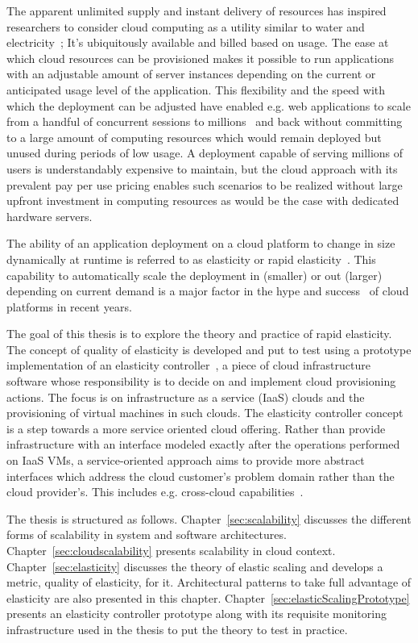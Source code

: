 \documentclass[english]{tktltiki2}
\theoremstyle{definition}
\theoremstyle{remark}
\begin{document}
The apparent unlimited supply and instant delivery of resources has inspired
researchers to consider cloud computing as a utility similar to water and
electricity~\cite{Buyya2009a}; It’s ubiquitously available and billed based on
usage. The ease at which cloud resources can be provisioned makes it possible to
run applications with an adjustable amount of server instances depending on the
current or anticipated usage level of the application. This flexibility and the
speed with which the deployment can be adjusted have enabled e.g. web
applications to scale from a handful of concurrent sessions to millions~\cite{
cloudberkeleyviewacm} and back without committing to a large amount of computing
resources which would remain deployed but unused during periods of low usage. A
deployment capable of serving millions of users is understandably expensive to
maintain, but the cloud approach with its prevalent pay per use pricing enables
such scenarios to be realized without large upfront investment in computing
resources as would be the case with dedicated hardware servers.

The ability of an application deployment on a cloud platform to change in size
dynamically at runtime is referred to as elasticity or rapid elasticity~\cite{
nistdefinition}. This capability to automatically scale the deployment in
(smaller) or out (larger) depending on current demand is a major factor in
the hype and success~\cite{cloudberkeleyviewacm} of cloud platforms in recent years.

The goal of this thesis is to explore the theory and practice of rapid
elasticity. The concept of quality of elasticity is developed and put to test
using a prototype implementation of an elasticity controller~\cite{VRB11}, a
piece of cloud infrastructure software whose responsibility is to decide on and
implement cloud provisioning actions. The focus is on infrastructure as a
service (IaaS) clouds and the provisioning of virtual machines in such clouds.
The elasticity controller concept is a step towards a more service oriented
cloud offering. Rather than provide infrastructure with an interface modeled
exactly after the operations performed on IaaS VMs, a service-oriented approach
aims to provide more abstract interfaces which address the cloud customer’s
problem domain rather than the cloud provider’s. This includes e.g. cross-cloud
capabilities~\cite{frominfratoservice}.

The thesis is structured as follows. Chapter~\ref{sec:scalability} discusses the
different forms of scalability in system and software architectures.
Chapter~\ref{sec:cloudscalability} presents scalability in cloud context.
Chapter~\ref{sec:elasticity} discusses the theory of elastic scaling and
develops a metric, quality of elasticity, for it. Architectural patterns to take
full advantage of elasticity are also presented in this chapter.
Chapter~\ref{sec:elasticScalingPrototype} presents an elasticity controller
prototype along with its requisite monitoring infrastructure used in the thesis
to put the theory to test in practice.
\end{document}

